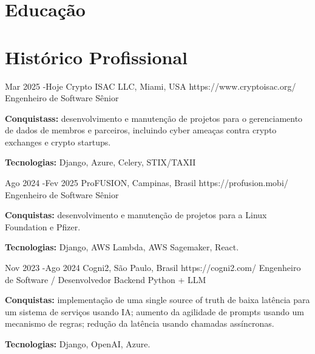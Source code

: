 \documentclass[10pt]{article} %
\begin{document}

\section{Educação}



\section{Histórico Profissional}

\job
{Mar 2025 -}{Hoje}
{Crypto ISAC LLC, Miami, USA}
{https://www.cryptoisac.org/}
{Engenheiro de Software Sênior}
{\rule{0mm}{2mm}\textbf{Conquistass:} desenvolvimento e manutenção de projetos para o gerenciamento de dados de membros e parceiros, incluindo cyber ameaças contra crypto exchanges e crypto startups.\\
\rule{0mm}{3mm}\textbf{Tecnologias:} Django, Azure, Celery, STIX/TAXII}

\job
{Ago 2024 -}{Fev 2025}
{ProFUSION, Campinas, Brasil}
{https://profusion.mobi/}
{Engenheiro de Software Sênior}
{\rule{0mm}{2mm}\textbf{Conquistas:} desenvolvimento e manutenção de projetos para a Linux Foundation e Pfizer.\\
\rule{0mm}{3mm}\textbf{Tecnologias:} Django, AWS Lambda, AWS Sagemaker, React.}


\job
{Nov 2023 -}{Ago 2024}
{Cogni2, São Paulo, Brasil}
{https://cogni2.com/}
{Engenheiro de Software / Desenvolvedor Backend Python + LLM}
{\rule{0mm}{2mm}\textbf{Conquistas:} implementação de uma single source of truth  de baixa latência para um sistema de serviços usando IA; aumento da agilidade de prompts usando um mecanismo de regras; redução da latência usando chamadas assíncronas.\\
\rule{0mm}{3mm}\textbf{Tecnologias:} Django, OpenAI, Azure.}
\end{document}
